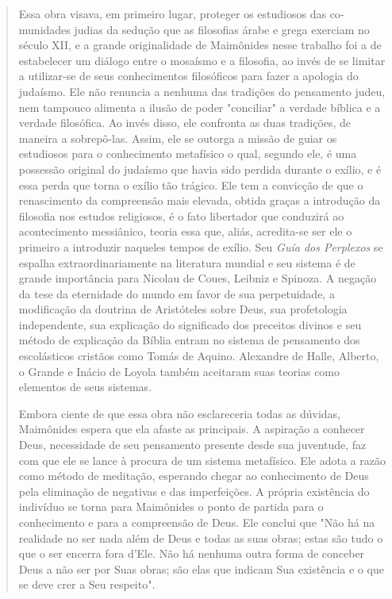 \begin{quote}
Essa obra visava, em primeiro lugar, proteger os estudiosos das
co­munidades judias da sedução que as filosofias árabe e grega exerciam
no século XII, e a grande originalidade de Maimônides nesse trabalho foi
a de estabelecer um diálogo entre o mosaísmo e a filosofia, ao invés de
se limitar a utilizar-se de seus conhecimentos filosóficos para fazer a
apologia do judaísmo. Ele não renuncia a nenhuma das tradições do
pensamento judeu, nem tampouco ali­menta a ilusão de poder "conciliar" a
verdade bíblica e a verdade filosófica. Ao invés disso, ele confronta as
duas tradições, de maneira a sobrepô-las. As­sim, ele se outorga a
missão de guiar os estudiosos para o conhecimento meta­físico o qual,
segundo ele, é uma possessão original do judaísmo que havia sido perdida
durante o exílio, e é essa perda que torna o exílio tão trágico. Ele tem
a convicção de que o renascimento da compreensão mais elevada, obtida
gra­ças a introdução da filosofia nos estudos religiosos, é o fato
libertador que con­duzirá ao acontecimento messiânico, teoria essa que,
aliás, acredita-se ser ele o primeiro a introduzir naqueles tempos de
exílio.
Seu \emph{Guía dos Perplexos} se espalha extraordinariamente na
literatura mundial e seu sistema é de grande importância para Nicolau de
Coues, Leibniz e Spinoza. A negação da tese da eternidade do mundo em
favor de sua perpe­tuidade, a modificação da doutrina de Aristóteles
sobre Deus, sua profetologia independente, sua explicação do significado
dos preceitos divinos e seu méto­do de explicação da Bíblia entram no
sistema de pensamento dos escolásticos cristãos como Tomás de Aquino.
Alexandre de Halle, Alberto, o Grande e Iná­cio de Loyola também
aceitaram suas teorias como elementos de seus sistemas.

Embora ciente de que essa obra não esclareceria todas as dúvidas,
Maimônides espera que ela afaste as principais. A aspiração a conhecer
Deus, necessidade de seu pensamento presente desde sua juventude, faz
com que ele se lance à procura de um sistema metafísico. Ele adota a
razão como método de meditação, esperando chegar ao conhecimento de Deus
pela eliminação de negativas e das imperfeições. A própria existência do
indivíduo se torna para Maimônides o ponto de partida para o
conhecimento e para a compreensão de Deus. Ele conclui que "Não há na
realidade no ser nada além de Deus e to­das as suas obras; estas são
tudo o que o ser encerra fora d'Ele. Não há nenhu­ma outra forma de
conceber Deus a não ser por Suas obras; são elas que indi­cam Sua
existência e o que se deve crer a Seu respeito".


\end{quote}

